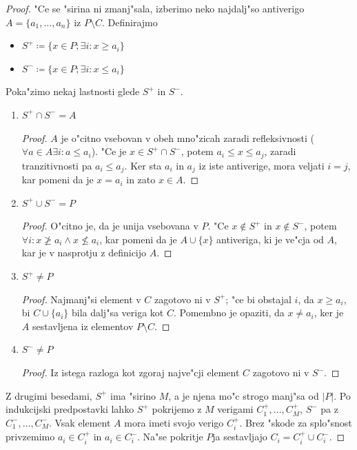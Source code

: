 \documentclass[a4paper,12pt]{article}
\theoremstyle{definition}
\theoremstyle{remark}
\begin{document}
\begin{proof}
	"Ce se "sirina ni zmanj"sala, izberimo neko najdalj"so antiverigo $A=\{a_1, \ldots, a_n\}$ iz $P \setminus C$. Definirajmo
	\begin{itemize}
		\item $S^+ \coloneqq \{x \in P; \exists i: x \geqslant a_i\}$
		\item $S^- \coloneqq \{x \in P; \exists i: x \leqslant a_i\}$
	\end{itemize}
	Poka"zimo nekaj lastnosti glede $S^+$ in $S^-$.
	\begin{enumerate}
		\item $S^+ \cap S^- = A$
		\begin{proof}
			$A$ je o"citno vsebovan v obeh mno"zicah zaradi refleksivnosti ($\forall a \in A \exists i: a \leqslant a_i$). "Ce je $x \in S^+ \cap S^-$, potem $a_i \leqslant x \leqslant a_j$, zaradi tranzitivnosti pa $a_i \leqslant a_j$. Ker sta $a_i$ in $a_j$ iz iste antiverige, mora veljati $i=j$, kar pomeni da je $x = a_i$ in zato $x \in A$.
		\end{proof}
		\item $S^+ \cup S^- = P$
		\begin{proof}
			O"citno je, da je unija vsebovana v $P$. "Ce $x \notin S^+$ in $x \notin S^-$, potem $\forall i: x \not\geqslant a_i \land x \not\leqslant a_i$, kar pomeni da je $A \cup \{x\}$ antiveriga, ki je ve"cja od $A$, kar je v nasprotju z definicijo $A$.
		\end{proof}
		\item $S^+ \neq P$
		\begin{proof}
			Najmanj"si element v $C$ zagotovo ni v $S^+$; "ce bi obstajal $i$, da $x \geqslant a_i$, bi $C \cup \{a_i\}$ bila dalj"sa veriga kot $C$. Pomembno je opaziti, da $x \neq a_i$, ker je $A$ sestavljena iz elementov $P \setminus C$.
		\end{proof}
		\item $S^- \neq P$
		\begin{proof}
			Iz istega razloga kot zgoraj najve"cji element $C$ zagotovo ni v $S^-$.
		\end{proof}
	\end{enumerate}
	Z drugimi besedami, $S^+$ ima "sirino $M$, a je njena mo"c strogo manj"sa od $|P|$. Po indukcijski predpostavki lahko $S^+$ pokrijemo z $M$ verigami $C_1^+, \ldots, C_M^+$, $S^-$ pa z $C_1^-, \ldots, C_M^-$. Vsak element $A$ mora imeti svojo verigo $C_i^+$. Brez "skode za splo"snost privzemimo $a_i \in C_i^+$ in $a_i \in C_i^-$. Na"se pokritje $P$ja sestavljajo $C_i = C_i^+ \cup C_i^-$.
\end{proof}
\end{document}

